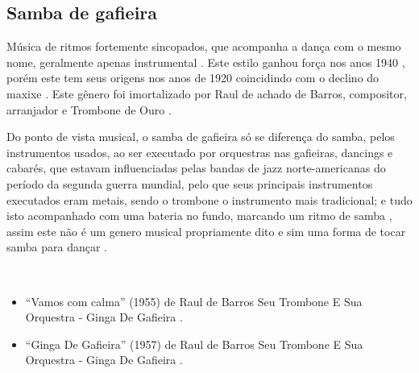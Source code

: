 \subsection{Samba de gafieira}
Música de ritmos fortemente sincopados, que acompanha a dança com o mesmo nome, geralmente apenas instrumental \cite[pp. 291]{dourado2004dicionario} \cite[pp. 685]{marcondes1977enciclopediav2}.
Este estilo ganhou força nos anos 1940 \cite[pp. 142]{perna2002samba} \cite[pp. 291]{dourado2004dicionario} \cite[pp. 685]{marcondes1977enciclopediav2},
porém este tem seus origens nos anos de 1920 coincidindo com o declino do maxixe \cite[pp. 63]{reinato2010musica}.
Este gênero foi imortalizado por Raul de achado de Barros, 
compositor, arranjador e Trombone de Ouro \cite[pp. 63]{reinato2010musica}.

Do ponto de vista musical, o samba de gafieira só se diferença do samba, 
pelos instrumentos usados, ao ser executado por orquestras nas gafieiras, dancings e cabarés,
que estavam influenciadas pelas bandas de jazz norte-americanas do período da segunda guerra mundial,
pelo que seus principais instrumentos executados eram metais, 
sendo o trombone o instrumento mais tradicional;
e tudo isto acompanhado com uma bateria no fundo, 
marcando um ritmo de samba \cite[pp. 131]{perna2002samba} \cite[pp. 685]{marcondes1977enciclopediav2},
assim este não é um genero musical propriamente dito e sim uma forma de tocar samba para dançar \cite[pp. 685]{marcondes1977enciclopediav2}.


\begin{example} ~

\begin{itemize}
\item ``Vamos com calma'' (1955) de  Raul de Barros Seu Trombone E Sua Orquestra - Ginga De Gafieira \cite{RaulDeBarrosMusic1}.
\item ``Ginga De Gafieira'' (1957) de  Raul de Barros Seu Trombone E Sua Orquestra - Ginga De Gafieira \cite{RaulDeBarrosMusic2}.
\end{itemize}
\end{example}

